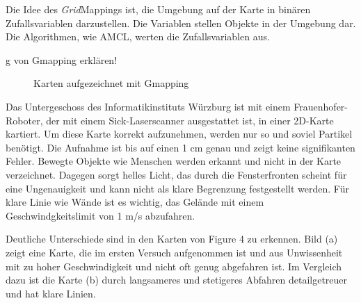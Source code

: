 \documentclass[11pt,a4paper]{article}
\begin{document}
{Die Idee des  \textit{Grid}Mappings ist, die Umgebung auf der Karte in bin\"aren Zufallsvariablen darzustellen. Die Variablen stellen Objekte in der Umgebung dar. Die Algorithmen, wie AMCL, werten die Zufallsvariablen aus. 

g von Gmapping erklären!

\begin{figure}[h]
	\centering
	\caption{Karten aufgezeichnet mit Gmapping}
\end{figure}


Das Untergeschoss des Informatikinstituts W\"urzburg ist mit einem Frauenhofer-Roboter, der mit einem Sick-Laserscanner ausgestattet ist, in einer 2D-Karte kartiert.  Um diese Karte korrekt aufzunehmen, werden nur so und soviel Partikel ben\"otigt. Die Aufnahme ist bis auf einen 1 cm genau und zeigt keine signifikanten Fehler. Bewegte Objekte wie Menschen werden erkannt und nicht in der Karte verzeichnet. Dagegen sorgt helles Licht, das durch die Fensterfronten scheint f\"ur eine Ungenauigkeit und kann nicht als klare Begrenzung festgestellt werden. F\"ur klare Linie wie W\"ande ist es wichtig, das Gel\"ande mit einem Geschwindgkeitslimit von 1 m/s abzufahren. 



Deutliche Unterschiede sind in den Karten von Figure 4 zu erkennen. Bild (a) zeigt eine Karte, die im ersten Versuch aufgenommen ist und aus Unwissenheit mit zu hoher Geschwindigkeit und nicht oft genug abgefahren ist. Im Vergleich dazu ist die Karte (b) durch langsameres und stetigeres Abfahren detailgetreuer und hat klare Linien.


}
\end{document}
